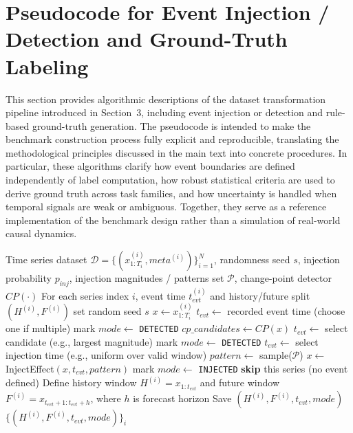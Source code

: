 

\appendix





\section{ Pseudocode for Event Injection / Detection and Ground-Truth Labeling}
\label{app:pseudocode}


This section provides algorithmic descriptions of the dataset transformation pipeline introduced in Section~3, including event injection or detection and rule-based ground-truth generation.
The pseudocode is intended to make the benchmark construction process fully explicit and reproducible, translating the methodological principles discussed in the main text into concrete procedures.
In particular, these algorithms clarify how event boundaries are defined independently of label computation, how robust statistical criteria are used to derive ground truth across task families, and how uncertainty is handled when temporal signals are weak or ambiguous.
Together, they serve as a reference implementation of the benchmark design rather than a simulation of real-world causal dynamics.


\begin{algorithm}[H]
\caption{Event Generation: Injection \textbf{or} Detection}
\label{alg:event_gen}
\begin{algorithmic}[1]
\REQUIRE Time series dataset $\mathcal{D} = \{(x^{(i)}_{1:T_i}, meta^{(i)})\}_{i=1}^N$, randomness seed $s$, injection probability $p_{inj}$, injection magnitudes / patterns set $\mathcal{P}$, change-point detector $CP(\cdot)$
\ENSURE For each series index $i$, event time $t^{(i)}_{evt}$ and history/future split $(H^{(i)}, F^{(i)})$
\STATE set random seed $s$
    \STATE $x \leftarrow x^{(i)}_{1:T_i}$
        \STATE $t_{evt} \leftarrow$ recorded event time (choose one if multiple)
        \STATE mark $mode \leftarrow$ \texttt{DETECTED}
    \ELSE
        \STATE $cp\_candidates \leftarrow CP(x)$ 
            \STATE $t_{evt} \leftarrow$ select candidate (e.g., largest magnitude)
            \STATE mark $mode \leftarrow$ \texttt{DETECTED}
        \ELSE
                \STATE $t_{evt} \leftarrow$ select injection time (e.g., uniform over valid window)
                \STATE $pattern \leftarrow$ sample($\mathcal{P}$)
                \STATE $x \leftarrow$ InjectEffect$(x, t_{evt}, pattern)$
                \STATE mark $mode \leftarrow$ \texttt{INJECTED}
            \ELSE
                \STATE \textbf{skip} this series (no event defined)
            \ENDIF
        \ENDIF
    \ENDIF
    \STATE Define history window $H^{(i)} = x_{1:t_{evt}}$ and future window $F^{(i)} = x_{t_{evt}+1 : t_{evt}+h}$, where $h$ is forecast horizon
    \STATE Save $(H^{(i)}, F^{(i)}, t_{evt}, mode)$
\ENDFOR
\RETURN $\{(H^{(i)}, F^{(i)}, t_{evt}, mode)\}_{i}$
\end{algorithmic}
\end{algorithm}

